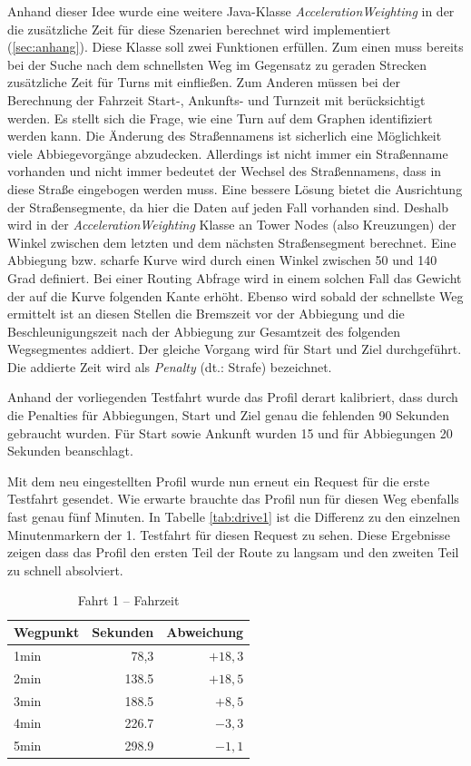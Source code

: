 \documentclass[12pt,a4paper]{article}
\begin{document}
Anhand dieser Idee wurde eine weitere Java-Klasse \textit{AccelerationWeighting} in der die zusätzliche Zeit für diese Szenarien berechnet wird implementiert (\ref{sec:anhang}).
Diese Klasse soll zwei Funktionen erfüllen. Zum einen muss bereits bei der Suche nach dem schnellsten Weg im Gegensatz zu geraden Strecken zusätzliche Zeit für Turns mit einfließen. Zum Anderen müssen bei der Berechnung der Fahrzeit Start-, Ankunfts- und Turnzeit mit berücksichtigt werden. 
Es stellt sich die Frage, wie eine Turn auf dem Graphen identifiziert werden kann. Die Änderung des Straßennamens ist sicherlich eine Möglichkeit viele Abbiegevorgänge abzudecken. Allerdings ist nicht immer ein Straßenname vorhanden und nicht immer bedeutet der Wechsel des Straßennamens, dass in diese Straße eingebogen werden muss.
Eine bessere Lösung bietet die Ausrichtung der Straßensegmente, da hier die Daten auf jeden Fall vorhanden sind. Deshalb wird in der \textit{AccelerationWeighting} Klasse an Tower Nodes (also Kreuzungen) der Winkel zwischen dem letzten und dem nächsten Straßensegment berechnet.
Eine Abbiegung bzw. scharfe Kurve wird durch einen Winkel zwischen 50 und 140 Grad definiert.
Bei einer Routing Abfrage wird in einem solchen Fall das Gewicht der auf die Kurve folgenden Kante erhöht. Ebenso wird sobald der schnellste Weg ermittelt ist an diesen Stellen die Bremszeit vor der Abbiegung und die Beschleunigungszeit nach der Abbiegung zur Gesamtzeit des folgenden Wegsegmentes addiert. Der gleiche Vorgang wird für Start und Ziel durchgeführt. Die addierte Zeit wird als \textit{Penalty} (dt.: Strafe) bezeichnet.

Anhand der vorliegenden Testfahrt wurde das Profil derart kalibriert, dass durch die Penalties für Abbiegungen, Start und Ziel genau die fehlenden 90 Sekunden gebraucht wurden.
Für Start sowie Ankunft wurden 15 und für Abbiegungen 20 Sekunden beanschlagt.

Mit dem neu eingestellten Profil wurde nun erneut ein Request für die erste Testfahrt gesendet. Wie erwarte brauchte das Profil nun für diesen Weg ebenfalls fast genau fünf Minuten.
In Tabelle \ref{tab:drive1} ist die Differenz zu den einzelnen Minutenmarkern der 1. Testfahrt für diesen Request zu sehen. Diese Ergebnisse zeigen dass das Profil den ersten Teil der Route zu langsam und den zweiten Teil zu schnell absolviert.

\begin{table}[h]
\centering
\caption{Fahrt 1 -- Fahrzeit}
\label{tab:drive11}
\begin{tabular}{|l|r|r|}
\hline
Wegpunkt & Sekunden & Abweichung \\ \hline 
1min & 78,3 & $+18,3$ \\
2min & 138.5 & $+18,5$ \\
3min & 188.5 & $+8,5$ \\
4min & 226.7 & $-3,3$ \\
5min & 298.9 & $-1,1$ \\
\hline
\end{tabular}
\end{table}
\end{document}
